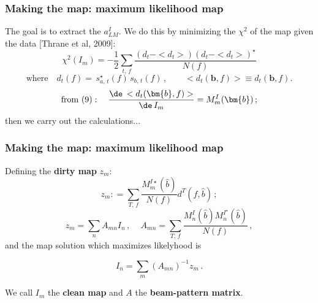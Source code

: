 \begin{frame}
	\frametitle{Making the map: maximum likelihood map}

		The goal is to extract the $a^I_{LM}$. We do this by minimizing the 			$\chi^2$ of the map given the data [Thrane et al, 2009]:\\
        \begin{equation}
		\chi^2(I_{m}) = -\frac{1}{2} \sum_{t,\,f}\frac{(d_t-<d_t>)(d_t-			<d_t>)^\star}{N(f)}
		\label{chisqu}
		\end{equation}
        $$\text{where}\quad d_t(f) = \, s^\star_{a,\,t}(f)\,s_{b,\,t}(f)\,, \qquad 	 <d_t(\bm{b}, f)>\equiv d_t(\bm{b}, f) .
 $$	%
        $$
        \medskip
        \text{from (9)}: \quad \frac{\de \,<d_t(\bm{b},f)>}{\de\, I_{m}} = M_{m}^I(\bm{b})\,;
        $$
    then we carry out the calculations...
\end{frame}


\begin{frame}
	\frametitle{Making the map: maximum likelihood map}
    \smallskip
		Defining the \textbf{dirty map} $z_{m}$:
        \begin{equation}
			z_{m} : = \sum_{T,\, f} \frac{M_{m}^{I\star}(\hat{b})}{N(f)} d^T(f, \hat{b})\,;
			\label{dirtym}
		\end{equation}
		\begin{equation}
			z_{m} = \sum_{n} A_{mn}I_{n}\,, \,\,\,\,\,\,\, A_{mn} =  \sum_{T,\, f} 				\frac{M_{n}^I(\hat{b})M_{n}^{I^\star}(\hat{b}) }{N(f)}\,,
		\end{equation}
and the map solution which maximizes likelyhood is 
\begin{block}{}
\begin{equation}
I_{n} = \sum_{m}  \left(A_{mn}\right)^{-1} z_{m} \,.
\end{equation}
\end{block}
We call $I_m$ the \textbf{clean map} and $A$ the \textbf{beam-pattern matrix}. 
\end{frame}


